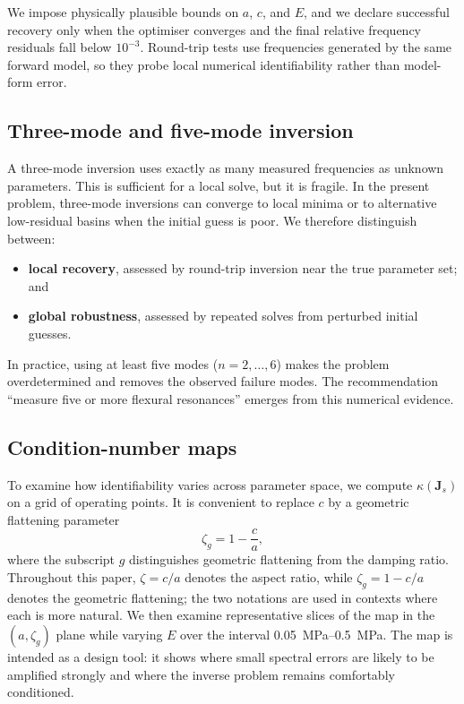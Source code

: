 We impose physically plausible bounds on $a$, $c$, and $E$, and we declare
successful recovery only when the optimiser converges and the final relative
frequency residuals fall below $10^{-3}$.  Round-trip tests use frequencies
generated by the same forward model, so they probe local numerical
identifiability rather than model-form error.

\subsection{Three-mode and five-mode inversion}

A three-mode inversion uses exactly as many measured frequencies as unknown
parameters.  This is sufficient for a local solve, but it is fragile.  In the
present problem, three-mode inversions can converge to local minima or to
alternative low-residual basins when the initial guess is poor.  We therefore
distinguish between:
\begin{itemize}
  \item \textbf{local recovery}, assessed by round-trip inversion near the true
  parameter set; and
  \item \textbf{global robustness}, assessed by repeated solves from perturbed
  initial guesses.
\end{itemize}
In practice, using at least five modes ($n=2,\ldots,6$) makes the problem
overdetermined and removes the observed failure modes.  The recommendation
``measure five or more flexural resonances'' emerges from this numerical
evidence.

\subsection{Condition-number maps}

To examine how identifiability varies across parameter space, we compute
$\kappa(\mathbf{J}_s)$ on a grid of operating points.  It is convenient to
replace $c$ by a geometric flattening parameter
\begin{equation}
  \zeta_g = 1 - \frac{c}{a},
\end{equation}
where the subscript $g$ distinguishes geometric flattening from the damping
ratio.  Throughout this paper, $\zeta = c/a$ denotes the aspect ratio, while
$\zeta_g = 1 - c/a$ denotes the geometric flattening; the two notations are
used in contexts where each is more natural.  We then examine representative slices of the map in the
$(a,\zeta_g)$ plane while varying $E$ over the interval
\SIrange{0.05}{0.5}{MPa}.  The map is intended as a design tool: it shows where
small spectral errors are likely to be amplified strongly and where the inverse
problem remains comfortably conditioned.

